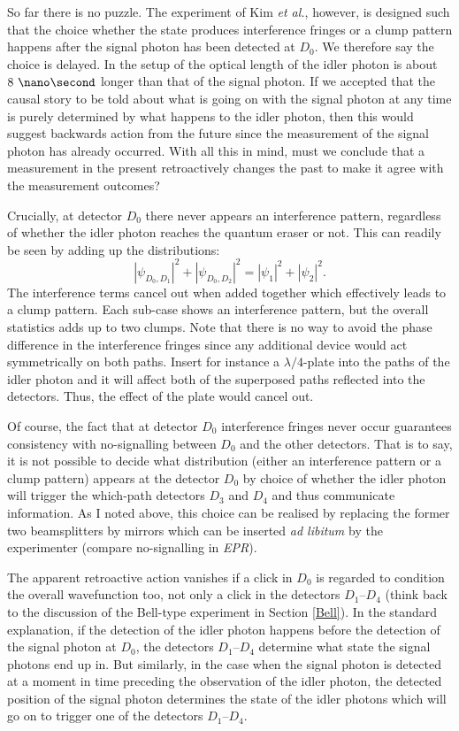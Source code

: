 \documentclass[11pt]{article}
\numberwithin{equation}{section}
\begin{document}
So far there is no puzzle. The experiment of Kim \textit{et al.}, however, is designed such that the choice whether the state produces interference fringes or a clump pattern happens after the signal photon has been detected at $D_0$. We therefore say the choice is delayed. In the setup of \cite{Kim1999} the optical length of the idler photon is about $8\ \nano\second$ longer than that of the signal photon. If we accepted that the causal story to be told about what is going on with the signal photon at any time is purely determined by what happens to the idler photon, then this would suggest backwards action from the future since the measurement of the signal photon has already occurred. With all this in mind, must we conclude that a measurement in the present retroactively changes the past to make it agree with the measurement outcomes? 

Crucially, at detector $D_0$ there never appears an interference pattern, regardless of whether the idler photon reaches the quantum eraser or not. This can readily be seen by adding up the distributions:
\begin{equation}
|\psi_{D_0, D_1}|^2 + |\psi_{D_0, D_2}|^2 = |\psi_1|^2+|\psi_2|^2.
\end{equation} The interference terms cancel out when added together which effectively leads to a clump pattern. Each sub-case shows an interference pattern, but the overall statistics adds up to two clumps. Note that there is no way to avoid the phase difference in the interference fringes since any additional device would act symmetrically on both paths. Insert for instance a $\lambda/4$-plate into the paths of the idler photon and it will affect both of the superposed paths reflected into the detectors. Thus, the effect of the plate would cancel out.

Of course, the fact that at detector $D_0$ interference fringes never occur guarantees consistency with no-signalling between $D_0$ and the other detectors. That is to say, it is not possible to decide what distribution (either an interference pattern or a clump pattern) appears at the detector $D_0$ by choice of whether the idler photon will trigger the which-path detectors $D_3$ and $D_4$ and thus communicate information.  As I noted above, this choice can be realised by replacing the former two beamsplitters by mirrors which can be inserted \textit{ad libitum} by the experimenter (compare no-signalling in \textit{EPR}).

The apparent retroactive action vanishes if a click in $D_0$ is regarded to condition the overall wavefunction too, not only a click in the detectors $D_1$--$D_4$ (think back to the discussion of the Bell-type experiment in Section \ref{Bell}). In the standard explanation, if the detection of the idler photon happens before the detection of the signal photon at $D_0$, the detectors $D_1$--$D_4$ determine what state the signal photons end up in. But similarly, in the case when the signal photon is detected at a moment in time preceding the observation of the idler photon, the detected position of the signal photon determines the state of the idler photons which will go on to trigger one of the detectors $D_1$--$D_4$. 
\end{document}

